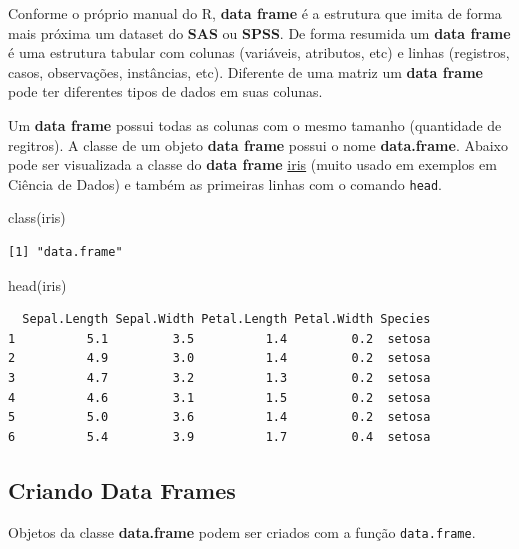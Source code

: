 \documentclass[
  letterpaper,
  DIV=11,
  numbers=noendperiod]{scrreprt}
\newenvironment{Shaded}{\begin{snugshade}}{\end{snugshade}}
\newcommand{\FunctionTok}[1]{\textcolor[rgb]{0.28,0.35,0.67}{#1}}
\newcommand{\NormalTok}[1]{\textcolor[rgb]{0.00,0.23,0.31}{#1}}
\begin{document}
Conforme o próprio manual do R, \textbf{data frame} é a estrutura que
imita de forma mais próxima um dataset do \textbf{SAS} ou \textbf{SPSS}.
De forma resumida um \textbf{data frame} é uma estrutura tabular com
colunas (variáveis, atributos, etc) e linhas (registros, casos,
observações, instâncias, etc). Diferente de uma matriz um \textbf{data
frame} pode ter diferentes tipos de dados em suas colunas.

Um \textbf{data frame} possui todas as colunas com o mesmo tamanho
(quantidade de regitros). A classe de um objeto \textbf{data frame}
possui o nome \textbf{data.frame}. Abaixo pode ser visualizada a classe
do \textbf{data frame}
\href{https://archive.ics.uci.edu/ml/datasets/iris}{iris} (muito usado
em exemplos em Ciência de Dados) e também as primeiras linhas com o
comando \texttt{head}.

\begin{Shaded}
\begin{Highlighting}[]
\FunctionTok{class}\NormalTok{(iris)}
\end{Highlighting}
\end{Shaded}

\begin{verbatim}
[1] "data.frame"
\end{verbatim}

\begin{Shaded}
\begin{Highlighting}[]
\FunctionTok{head}\NormalTok{(iris)}
\end{Highlighting}
\end{Shaded}

\begin{verbatim}
  Sepal.Length Sepal.Width Petal.Length Petal.Width Species
1          5.1         3.5          1.4         0.2  setosa
2          4.9         3.0          1.4         0.2  setosa
3          4.7         3.2          1.3         0.2  setosa
4          4.6         3.1          1.5         0.2  setosa
5          5.0         3.6          1.4         0.2  setosa
6          5.4         3.9          1.7         0.4  setosa
\end{verbatim}

\hypertarget{criando-data-frames}{%
\subsection{Criando Data Frames}\label{criando-data-frames}}

Objetos da classe \textbf{data.frame} podem ser criados com a função
\texttt{data.frame}.
\end{document}
